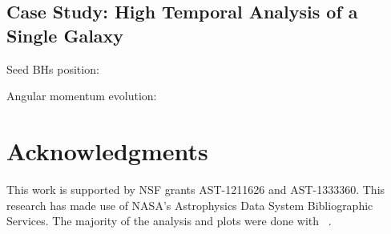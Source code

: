 \documentclass[useAMS,usenatbib]{mn2e}
\begin{document}
\subsection{Case Study: High Temporal Analysis of a Single Galaxy}

Seed BHs position:
\begin{figure}
\end{figure}

\begin{figure}
\end{figure}

\begin{figure}
\end{figure}
Angular momentum evolution:

\begin{figure}
\end{figure}



\section*{Acknowledgments}

This work is supported by NSF grants AST-1211626 and AST-1333360.
This research has made use of NASA's Astrophysics Data System
Bibliographic Services.  The majority of the analysis and plots were
done with \yt~\citep{yt_full_paper}.


\bsp
\label{lastpage}
\end{document}
